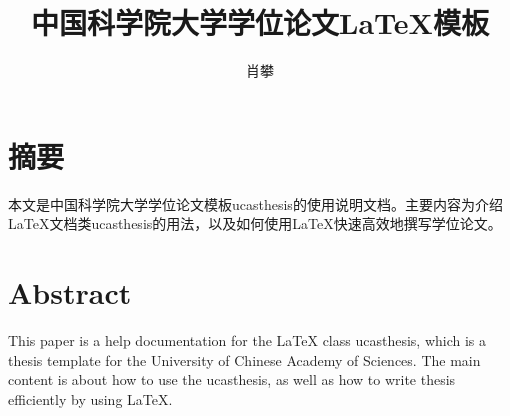   \title[国科大学位论文\LaTeX{}模板]{中国科学院大学学位论文\LaTeX{}模板}%
  \author{肖攀}%
\maketitle
\makeenglishtitle
\begin{spacing}{2.0}
\makedeclaration
\end{spacing}

\chapter{摘\quad 要}%
本文是中国科学院大学学位论文模板ucasthesis的使用说明文档。主要内容为介绍\LaTeX{}文档类ucasthesis的用法，以及如何使用\LaTeX{}快速高效地撰写学位论文。



\chapter{Abstract}%
This paper is a help documentation for the \LaTeX{} class ucasthesis, which is  a thesis template for the University of Chinese Academy of Sciences. The main content is about how to use the ucasthesis, as well as how to write thesis efficiently by using \LaTeX{}.

